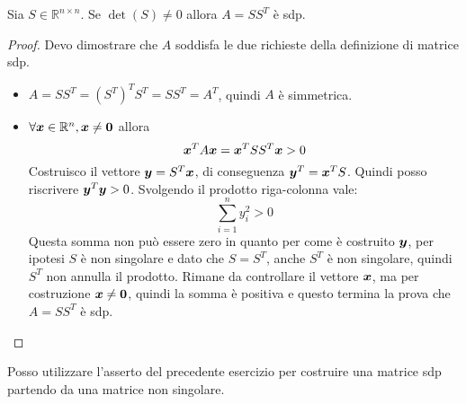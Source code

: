 \begin{exercise}
Sia $S \in \mathbb{R}^{n \times n}$. Se $\det(S) \not = 0$ allora $A = SS^{T}$
\`e sdp.
\end{exercise}
\begin{proof}
Devo dimostrare che $A$ soddisfa le due richieste della definizione di
matrice sdp.
\begin{itemize}
\item $A = SS^{T} = (S^{T})^{T}S^{T} = SS^{T} = A^{T}$, quindi $A$ \`e
simmetrica.
  \item $\forall \boldsymbol{x} \in \mathbb{R}^{n}, \boldsymbol{x} \not = \boldsymbol{0}$ allora
  \begin{displaymath}
\boldsymbol{x}^{T}A\boldsymbol{x} = \boldsymbol{x}^{T}SS^{T}\boldsymbol{x} > 0
\end{displaymath}
Costruisco il vettore $\boldsymbol{y} = S^{T}\boldsymbol{x}$, di conseguenza $\boldsymbol{y}^{T}
= \boldsymbol{x}^{T}S$. Quindi posso riscrivere
$\boldsymbol{y}^{T}\boldsymbol{y} > 0$.
Svolgendo il prodotto riga-colonna vale:
\begin{displaymath}
  	\sum_{i = 1}^{n}{y_{i}^{2}} > 0
  \end{displaymath}
  Questa somma non pu\`o essere zero in quanto per come \`e costruito
  $\boldsymbol{y}$, per ipotesi $S$ \`e non singolare e dato che $S = S^{T}$,  anche
  $S^{T}$ \`e non singolare, quindi $S^{T}$ non annulla il prodotto. Rimane da
  controllare il vettore $\boldsymbol{x}$, ma per costruzione $\boldsymbol{x} \not =
  \boldsymbol{0}$,  quindi la somma \`e positiva e questo termina la prova che $A =
  SS^{T}$ \`e sdp.
  \end{itemize}
\end{proof}
\begin{oss}
Posso utilizzare l'asserto del precedente esercizio per costruire una matrice
sdp partendo da una matrice non singolare.
\end{oss}

